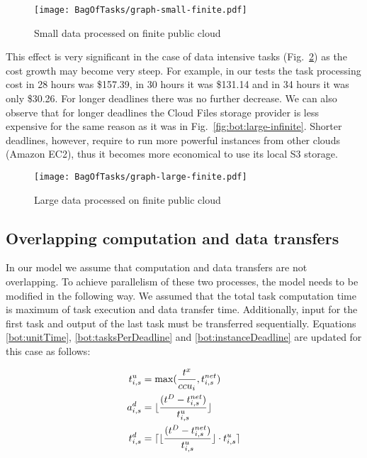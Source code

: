 {  \begin{figure}[tb]
     \centering
     \texttt{[image: BagOfTasks/graph-small-finite.pdf]}
     \caption{Small data processed on finite public
     cloud\label{fig:bot:small-finite}}
  \end{figure}

    
  This effect is very significant in the case of data intensive tasks (Fig.~\ref{fig:bot:large-finite}) as the cost growth may become very steep. For example, in our tests the task processing cost in 28 hours was \$157.39, in 30 hours it was \$131.14 and in 34 hours it was only \$30.26. For longer deadlines there was no further decrease. We can also observe that for longer deadlines the Cloud Files storage provider is less expensive for the same reason as it was in Fig.~\ref{fig:bot:large-infinite}. Shorter deadlines, however, require to run more powerful instances from other clouds (Amazon EC2), thus it becomes more economical to use its local S3 storage.
    
  \begin{figure}[tb]
     \centering
     \texttt{[image: BagOfTasks/graph-large-finite.pdf]}
     \caption{Large data processed on finite public
     cloud\label{fig:bot:large-finite}}
  \end{figure}  
  
\subsection{Overlapping computation and data transfers}
\label{sec:bot:overlapping}
  
  In our model we assume that computation and data transfers are not overlapping. To achieve parallelism of these two processes, the model needs to be modified in the following way. We assumed that the total task computation time is maximum of task execution and data transfer time. Additionally, input for the first task and output of the last task must be transferred sequentially. Equations \ref{bot:unitTime}, \ref{bot:tasksPerDeadline} and \ref{bot:instanceDeadline} are updated for this case as follows:
  
  \begin{align}
      t^u_{i,s} &= \max(\frac{t^x}{ccu_i}, t^{net}_{i,s})  \\    
      a^d_{i,s} &= \lfloor\frac{(t^D - t^{net}_{i,s})}{t^u_{i,s}}\rfloor \\         
      t^d_{i,s} &= \lceil\lfloor\frac{(t^D - t^{net}_{i,s})}{t^u_{i,s}} \rfloor \cdot t^u_{i,s} \rceil            
  \end{align}
  
}
